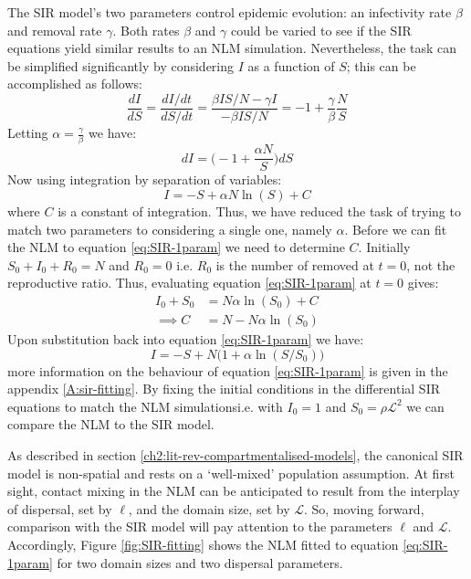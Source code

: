 The SIR model's two parameters control epidemic evolution: an infectivity rate $\beta$ and removal rate $\gamma$. 
Both rates $\beta$ and $\gamma$ could be varied to see if the SIR equations yield similar results to an NLM simulation. Nevertheless, the task can be simplified significantly by considering $I$ as a function of $S$; this can be accomplished as follows:
\[
\frac{dI}{dS}=\frac{dI / dt}{dS /dt}= \frac{\beta IS/N - \gamma I}{-\beta IS/N} = -1 + \frac{\gamma}{\beta} \frac{N}{S} \]
Letting $\alpha = \frac{\gamma}{\beta}$ we have:
\[
    dI = \Big(-1 + \frac{\alpha N}{S}\Big)dS
\]
Now using integration by separation of variables:
\begin{equation}
\label{eq:SIR-1param}
     I = -S + \alpha N \ln (S) + C
\end{equation}
where $C$ is a constant of integration. Thus, we have reduced the task of trying to match two parameters to considering a single one, namely $\alpha$. Before we can fit the NLM to equation \ref{eq:SIR-1param} we need to determine $C$. Initially $S_0 + I_0 + R_0= N$ and $R_0=0$ i.e. $R_0$ is the number of removed at $t=0$, not the reproductive ratio. Thus, evaluating equation \ref{eq:SIR-1param} at $t=0$ gives:
\begin{align*}
I_0 + S_0 & = N \alpha\ln (S_0) + C\\ 
 \implies C &= N - N \alpha \ln (S_0) 
\end{align*}
Upon substitution back into equation \ref{eq:SIR-1param} we have:
\begin{equation}
\label{eq:SIR-1param1}
    I = -S + N\big(1 + \alpha \ln (S/S_0)\big)
\end{equation}
more information on the behaviour of equation \ref{eq:SIR-1param} is given in the appendix \ref{A:sir-fitting}.
By fixing the initial conditions in the differential SIR equations to match the NLM simulations\textemdash i.e. with $I_0=1$ and $S_0=\rho \mathcal{L}^2$ \textemdash we can compare the NLM to the SIR model.

As described in section \ref{ch2:lit-rev-compartmentalised-models}, the canonical SIR model is non-spatial and rests on a `well-mixed' population assumption.
At first sight, contact mixing in the NLM can be anticipated to result from the interplay of dispersal, set by $\ell$, and the domain size, set by $\mathcal{L}$.
So, moving forward, comparison with the SIR model will pay attention to the parameters $\ell$ and $\mathcal{L}$. Accordingly, Figure \ref{fig:SIR-fitting} shows the NLM fitted to equation \ref{eq:SIR-1param} for two domain sizes and two dispersal parameters.

